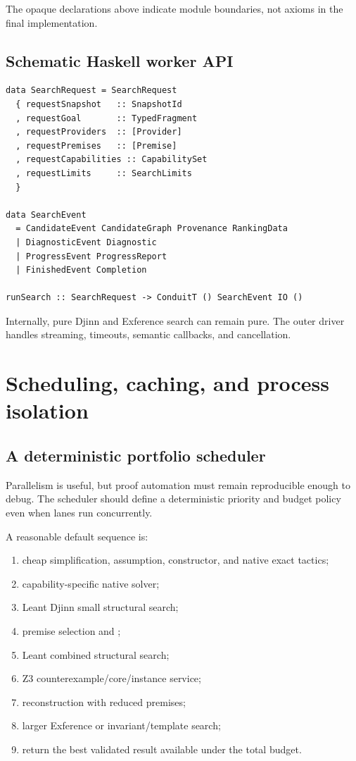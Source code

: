 \documentclass[11pt,letterpaper,openany]{report}
\newcommand{\code}[1]{\texttt{\detokenize{#1}}}
\begin{document}
The opaque declarations above indicate module boundaries, not axioms in the final
implementation.

\section{Schematic Haskell worker API}

\begin{lstlisting}[language=HaskellLite,caption={Possible Leant/Djex worker boundary}]
data SearchRequest = SearchRequest
  { requestSnapshot   :: SnapshotId
  , requestGoal       :: TypedFragment
  , requestProviders  :: [Provider]
  , requestPremises   :: [Premise]
  , requestCapabilities :: CapabilitySet
  , requestLimits     :: SearchLimits
  }

data SearchEvent
  = CandidateEvent CandidateGraph Provenance RankingData
  | DiagnosticEvent Diagnostic
  | ProgressEvent ProgressReport
  | FinishedEvent Completion

runSearch :: SearchRequest -> ConduitT () SearchEvent IO ()
\end{lstlisting}

Internally, pure Djinn and Exference search can remain pure. The outer driver handles
streaming, timeouts, semantic callbacks, and cancellation.

\chapter{Scheduling, caching, and process isolation}
\label{ch:scheduling}

\section{A deterministic portfolio scheduler}

Parallelism is useful, but proof automation must remain reproducible enough to debug.
The scheduler should define a deterministic priority and budget policy even when lanes
run concurrently.

A reasonable default sequence is:

\begin{enumerate}
  \item cheap simplification, assumption, constructor, and native exact tactics;
  \item capability-specific native solver;
  \item Leant Djinn small structural search;
  \item premise selection and \code{grind};
  \item Leant combined structural search;
  \item Z3 counterexample/core/instance service;
  \item reconstruction with reduced premises;
  \item larger Exference or invariant/template search;
  \item return the best validated result available under the total budget.
\end{enumerate}
\end{document}
